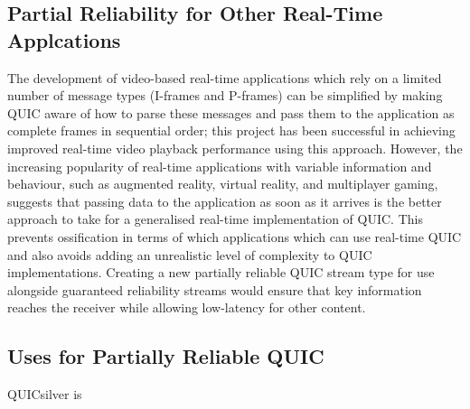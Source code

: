 \documentclass{mpaper}
\begin{document}
\subsection{Partial Reliability for Other Real-Time Applcations}
The development of video-based real-time applications which rely on a limited number of message types (I-frames and P-frames) can be simplified by making QUIC aware of how to parse these messages and pass them to the application as complete frames in sequential order; this project has been successful in achieving improved real-time video playback performance using this approach. However, the increasing popularity of real-time applications with variable information and behaviour, such as augmented reality, virtual reality, and multiplayer gaming, suggests that passing data to the application as soon as it arrives is the better approach to take for a generalised real-time implementation of QUIC. This prevents ossification in terms of which applications which can use real-time QUIC and also avoids adding an unrealistic level of complexity to QUIC implementations. Creating a new partially reliable QUIC stream type for use alongside guaranteed reliability streams would ensure that key information reaches the receiver while allowing low-latency for other content.


\subsection{Uses for Partially Reliable QUIC}
QUICsilver is 

\end{document}
